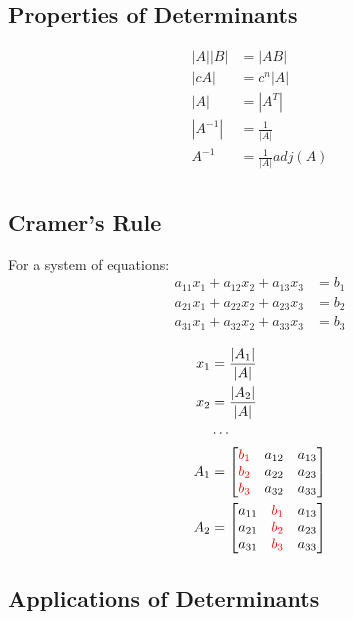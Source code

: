 \documentclass[]{article}
\begin{document}
\subsection{Properties of Determinants}
\begin{align}
	|A||B| &= |AB| \\
	|cA| &= c^n|A| \\
	|A| &= |A^T| \\
	|A^{-1}| &= \frac{1}{|A|} \\
	A^{-1} &= \frac{1}{|A|}adj(A) \\	
\end{align}

\subsection{Cramer's Rule}
For a system of equations: \\
\begin{align*}
	a_{11}x_1 + a_{12}x_2 + a_{13}x_3 &= b_1 \\
	a_{21}x_1 + a_{22}x_2 + a_{23}x_3 &= b_2 \\
	a_{31}x_1 + a_{32}x_2 + a_{33}x_3 &= b_3 \\
\end{align*}
\begin{align*}
	x_1 &= \frac{|A_1|}{|A|} \\
	x_2 &= \frac{|A_2|}{|A|} \\
		&\cdots \\
	A_1 &=
		\begin{bmatrix}
			\color{red}{b_1} & a_{12} & a_{13} \\
			\color{red}{b_{2}} & a_{22} & a_{23} \\
			\color{red}{b_{3}} & a_{32} & a_{33} \\
		\end{bmatrix} \\
	A_2 &=
		\begin{bmatrix}
			a_{11} & \color{red}{b_{1}} & a_{13} \\
			a_{21} & \color{red}{b_{2}} & a_{23} \\
			a_{31} & \color{red}{b_{3}} & a_{33} \\
		\end{bmatrix} 
\end{align*}

\subsection{Applications of Determinants}
\end{document}
